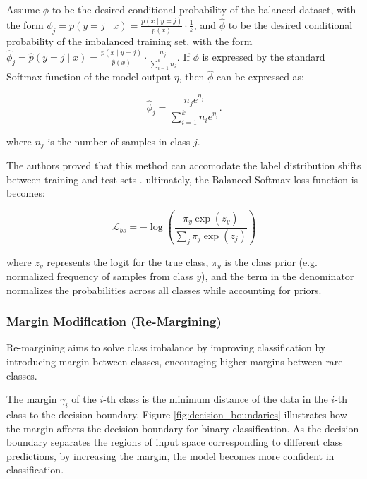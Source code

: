 Assume $\phi$ to be the desired conditional probability of the balanced dataset, with the form $\phi_j = p(y = j \mid x) = \frac{p(x \mid y=j)}{p(x)} \cdot \frac{1}{k}$, and $\hat{\phi}$ to be the desired conditional probability of the imbalanced training set, with the form $\hat{\phi}_j = \hat{p}(y = j \mid x) = \frac{p(x \mid y=j)}{\hat{p}(x)} \cdot \frac{n_j}{\sum_{i=1}^{k} n_i}$. If $\phi$ is expressed by the standard Softmax function of the model output $\eta$, then $\hat{\phi}$ can be expressed as:

\begin{equation}
    \hat{\phi}_j = \frac{n_j e^{\eta_j}}{\sum_{i=1}^{k} n_i e^{\eta_i}}.
\end{equation}

where $n_j$ is the number of samples in class $j$.

The authors proved that this method can accomodate the label distribution shifts between training and test sets \cite{ren2020balancedmetasoftmaxlongtailedvisual}. ultimately, the Balanced Softmax loss function is becomes:

\begin{equation}
    \mathcal{L}_{bs} = - \log\left( \frac{\pi_y \exp(z_y)}{\sum_j \pi_j \exp(z_j)} \right)
\end{equation}

where $z_y$ represents the logit for the true class, $\pi_y$ is the class prior (e.g. normalized frequency of samples from class $y$), and the term in the denominator normalizes the probabilities across all classes while accounting for priors.


\subsubsection{Margin Modification (Re-Margining)}
\label{sec:margin_mod}
Re-margining aims to solve class imbalance by improving classification by introducing margin between classes, encouraging higher margins between rare classes. 

The margin $\gamma_i$ of the $i$-th class is the minimum distance of the data in the $i$-th class to the decision boundary. Figure \ref{fig:decision_boundaries} illustrates how the margin affects the decision boundary for binary classification. As the decision boundary separates the regions of input space corresponding to different class predictions, by increasing the margin, the model becomes more confident in classification.


